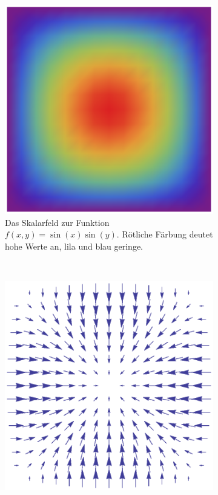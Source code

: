 \begin{figure}[ht]
	\begin{subfigure}[t]{0.45\textwidth}
		\centering
		\includegraphics[width=\textwidth]{images/scalar_field_to_show_gradient}
		\caption{Das Skalarfeld zur Funktion $f(x,y) = \sin(x)\sin(y)$. Rötliche Färbung deutet hohe Werte an, lila und blau geringe.}
\label{fig:mathematics_sample_scalar_field}
	\end{subfigure}
~
	\begin{subfigure}[t]{0.45\textwidth}
		\centering
		\includegraphics[width=\textwidth]{images/gradient_of_scalar_field}

\end{subfigure}
\end{figure}
